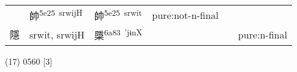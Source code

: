\documentclass[14pt,a4paper]{scrartcl}
\begin{document}
\begin{longtable}[c]{@{}llllll@{}}
\begin{minipage}[t]{0.14\columnwidth}\raggedright\strut
\strut\end{minipage} &
\begin{minipage}[t]{0.14\columnwidth}\raggedright\strut
帥\textsuperscript{5e25~srwijH}
\strut\end{minipage} &
\begin{minipage}[t]{0.14\columnwidth}\raggedright\strut
帥\textsuperscript{5e25~srwit}
\strut\end{minipage} &
\begin{minipage}[t]{0.14\columnwidth}\raggedright\strut
pure:not-n-final
\strut\end{minipage}\tabularnewline
\begin{minipage}[t]{0.14\columnwidth}\raggedright\strut
隱
\strut\end{minipage} &
\begin{minipage}[t]{0.14\columnwidth}\raggedright\strut
srwit, srwijH
\strut\end{minipage} &
\begin{minipage}[t]{0.14\columnwidth}\raggedright\strut
檃\textsuperscript{6a83~'jɨnX}
\strut\end{minipage} &
\begin{minipage}[t]{0.14\columnwidth}\raggedright\strut
\strut\end{minipage} &
\begin{minipage}[t]{0.14\columnwidth}\raggedright\strut
\strut\end{minipage} &
\begin{minipage}[t]{0.14\columnwidth}\raggedright\strut
pure:n-final
\strut\end{minipage}\tabularnewline
\bottomrule
\end{longtable}

(17) 0560 {[}3{]}
\end{document}
